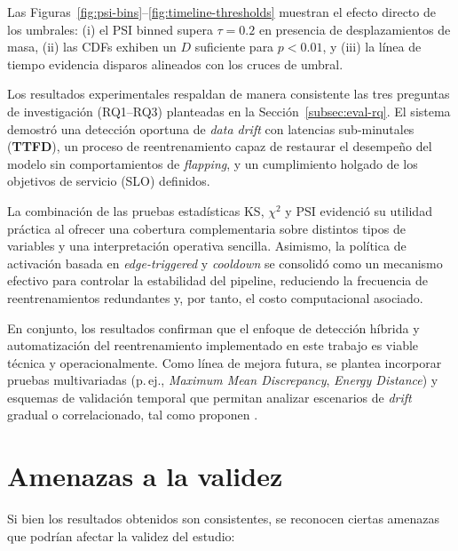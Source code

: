 Las Figuras~\ref{fig:psi-bins}--\ref{fig:timeline-thresholds} muestran el efecto directo de los
umbrales: (i) el PSI binned supera $\tau=0.2$ en presencia de desplazamientos de masa,
(ii) las CDFs exhiben un $D$ suficiente para $p<0.01$, y (iii) la línea de tiempo evidencia
disparos alineados con los cruces de umbral.

Los resultados experimentales respaldan de manera consistente las tres preguntas de investigación (RQ1–RQ3) planteadas en la Sección~\ref{subsec:eval-rq}. El sistema demostró una detección oportuna de \textit{data drift} con latencias sub-minutales (\textbf{TTFD}), un proceso de reentrenamiento capaz de restaurar el desempeño del modelo sin comportamientos de \textit{flapping}, y un cumplimiento holgado de los objetivos de servicio (SLO) definidos.  

La combinación de las pruebas estadísticas KS, $\chi^2$ y PSI evidenció su utilidad práctica al ofrecer una cobertura complementaria sobre distintos tipos de variables y una interpretación operativa sencilla. Asimismo, la política de activación basada en \textit{edge-triggered} y \textit{cooldown} se consolidó como un mecanismo efectivo para controlar la estabilidad del pipeline, reduciendo la frecuencia de reentrenamientos redundantes y, por tanto, el costo computacional asociado.  

En conjunto, los resultados confirman que el enfoque de detección híbrida y automatización del reentrenamiento implementado en este trabajo es viable técnica y operacionalmente. Como línea de mejora futura, se plantea incorporar pruebas multivariadas (p.\,ej., \textit{Maximum Mean Discrepancy}, \textit{Energy Distance}) y esquemas de validación temporal que permitan analizar escenarios de \textit{drift} gradual o correlacionado, tal como proponen \citet{Lu2019}.

\section{Amenazas a la validez}
\label{subsec:eval-threats}

Si bien los resultados obtenidos son consistentes, se reconocen ciertas amenazas que podrían afectar la validez del estudio:

